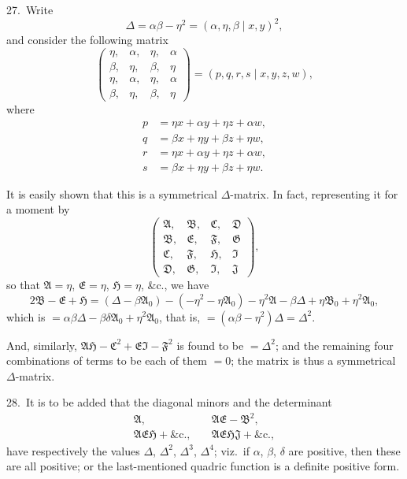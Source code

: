 \documentclass[11pt,a4paper]{book}
\begin{document}
27.\ Write
\[
\Delta = \alpha\beta - \eta^2 = (\alpha, \eta, \beta \mid x, y)^2,
\]
and consider the following matrix
\[
\begin{pmatrix}
\eta, & \alpha, & \eta, & \alpha\\
\beta, & \eta, & \beta, & \eta\\
\eta, & \alpha, & \eta, & \alpha\\
\beta, & \eta, & \beta, & \eta
\end{pmatrix}
= (p, q, r, s \mid x, y, z, w),
\]
where
\begin{align*}
p &= \eta x + \alpha y + \eta z + \alpha w,\\
q &= \beta x + \eta y + \beta z + \eta w,\\
r &= \eta x + \alpha y + \eta z + \alpha w,\\
s &= \beta x + \eta y + \beta z + \eta w.
\end{align*}

It is easily shown that this is a symmetrical $\Delta$-matrix. In fact, representing it for a moment by
\[
\begin{pmatrix}
\mathfrak{A}, & \mathfrak{B}, & \mathfrak{C}, & \mathfrak{D}\\
\mathfrak{B}, & \mathfrak{E}, & \mathfrak{F}, & \mathfrak{G}\\
\mathfrak{C}, & \mathfrak{F}, & \mathfrak{H}, & \mathfrak{I}\\
\mathfrak{D}, & \mathfrak{G}, & \mathfrak{I}, & \mathfrak{J}
\end{pmatrix},
\]
so that $\mathfrak{A} = \eta$, $\mathfrak{E} = \eta$, $\mathfrak{H} = \eta$, \&c., we have
\[
2\mathfrak{B} - \mathfrak{E} + \mathfrak{H} = (\Delta - \beta\mathfrak{A}_0) - (-\eta^2 - \eta\mathfrak{A}_0) - \eta^2\mathfrak{A} - \beta\Delta + \eta\mathfrak{B}_0 + \eta^2\mathfrak{A}_0,
\]
which is $= \alpha\beta\Delta - \beta\delta\mathfrak{A}_0 + \eta^2\mathfrak{A}_0$, that is, $= (\alpha\beta - \eta^2)\Delta = \Delta^2$.

And, similarly, $\mathfrak{A}\mathfrak{H} - \mathfrak{C}^2 + \mathfrak{E}\mathfrak{I} - \mathfrak{F}^2$ is found to be $= \Delta^2$; and the remaining four combinations of terms to be each of them $= 0$; the matrix is thus a symmetrical $\Delta$-matrix.

\medskip

28.\ It is to be added that the diagonal minors and the determinant
\begin{align*}
\mathfrak{A}, &\quad \mathfrak{A}\mathfrak{E} - \mathfrak{B}^2,\\
\mathfrak{A}\mathfrak{E}\mathfrak{H} + \text{\&c.}, &\quad \mathfrak{A}\mathfrak{E}\mathfrak{H}\mathfrak{J} + \text{\&c.},
\end{align*}
have respectively the values $\Delta$, $\Delta^2$, $\Delta^3$, $\Delta^4$; viz.\ if $\alpha$, $\beta$, $\delta$ are positive, then these are all positive; or the last-mentioned quadric function is a definite positive form.
\end{document}

